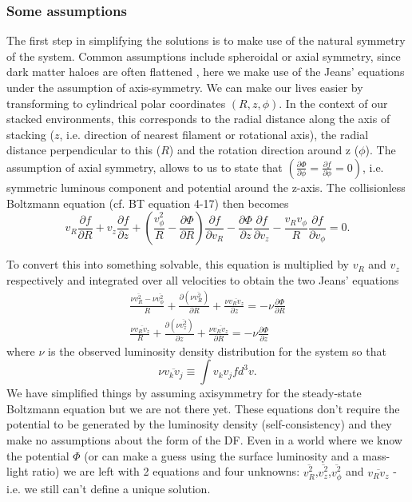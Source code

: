 \subsubsection{Some assumptions}
The first step in simplifying the solutions is to make use of the natural symmetry of the system. Common assumptions include spheroidal or axial symmetry, since dark matter haloes are often flattened \citep[e.g. in Illustris;][]{chua2019}, here we make use of the Jeans' equations under the assumption of axis-symmetry. We can make our lives easier by transforming to cylindrical polar coordinates $(R,z,\phi)$. In the context of our stacked environments, this corresponds to the radial distance along the axis of stacking ($z$, i.e. direction of nearest filament or rotational axis), the radial distance perpendicular to this ($R$) and the rotation direction around z ($\phi$). The assumption of axial symmetry, allows to us to state that $(\frac{\partial \Phi}{\partial \phi} = \frac{\partial f}{\partial \phi} = 0)$, i.e. symmetric luminous component and potential around the z-axis. The collisionless Boltzmann equation (cf. BT equation 4-17) then becomes
\begin{equation}
v_{R}\frac{\partial f}{\partial R} + v_{z}\frac{\partial f}{\partial z} + \left(\frac{v_{\phi}^2}{R} - \frac{\partial \Phi}{\partial R}\right)\frac{\partial f}{\partial v_{R}} -\frac{\partial \Phi}{\partial z}\frac{\partial f}{\partial v_z} - \frac{v_R v_{\phi}}{R}\frac{\partial f}{\partial v_{\phi}} = 0.
\end{equation}

To convert this into something solvable, this equation is multiplied by $v_R$ and $v_z$ respectively and integrated over all velocities to obtain the two Jeans' equations \citep[][; BT equation 4-29a,c]{jeans1922}
\begin{eqnarray} \label{basic_jeans1}
\frac{\nu \overline{v_{R}^{2}} - \nu \overline{v_{\phi}^{2}}}{R} + \frac{\partial (\nu \overline{v^{2}_{R}})}{\partial R} + \frac{\nu \overline{v_{R} v_{z}}}{\partial z} = - \nu \frac{\partial \Phi}{\partial R} \\
\frac{\nu \overline{v_{R}v_{z}}}{R} + \frac{\partial (\nu \overline{v^{2}_{z}})}{\partial z} + \frac{\nu \overline{v_{R} v_{z}}}{\partial R} = - \nu \frac{\partial \Phi}{\partial z} \label{basic_jeans2}
\end{eqnarray}
where $\nu$ is the observed luminosity density distribution for the system so that
\begin{equation}
\nu \overline{v_{k}v_{j}} \equiv \int v_{k} v_{j} f d^{3}v.
\end{equation}
We have simplified things by assuming axisymmetry for the steady-state Boltzmann equation but we are not there yet. These equations don't require the potential to be generated by the luminosity density (self-consistency) and they make no assumptions about the form of the DF. Even in a world where we know the potential $\Phi$ (or can make a guess using the surface luminosity and a mass-light ratio) we are left with 2 equations and four unknowns: $\overline{v_{R}^{2}}$,$\overline{v_{z}^{2}}$,$\overline{v_{\phi}^{2}}$ and $\overline{v_{R}v_{z}}$ - i.e. we still can't define a unique solution. 

